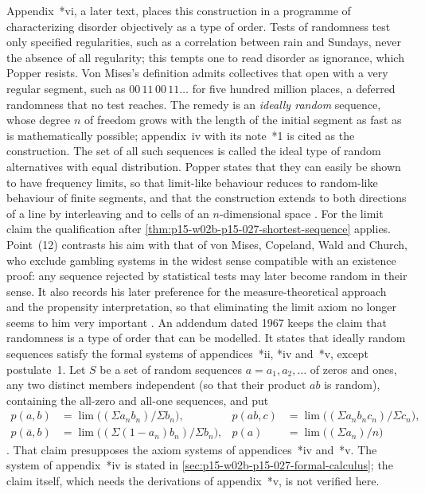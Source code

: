Appendix~*vi, a later text, places this construction in a programme of
characterizing disorder objectively as a type of order. Tests of
randomness test only specified regularities, such as a correlation
between rain and Sundays, never the absence of all regularity; this
tempts one to read disorder as ignorance, which Popper resists. Von
Mises's definition admits collectives that open with a very regular
segment, such as \(00\,11\,00\,11\ldots\) for five hundred million
places, a deferred randomness that no test reaches. The remedy is an
\emph{ideally random} sequence, whose degree \(n\) of freedom grows with
the length of the initial segment as fast as is mathematically
possible; appendix~iv with its note~*1 is cited as the construction. The
set of all such sequences is called the ideal type of random
alternatives with equal distribution. Popper states that they can easily
be shown to have frequency limits, so that limit-like behaviour reduces
to random-like behaviour of finite segments, and that the construction
extends to both directions of a line by interleaving and to cells of an
\(n\)-dimensional space \parencite[appendix~*vi, points~(1)--(11),
pp.~369--371]{Popper2002LogicDiscoveryUI}. For the limit claim the
qualification after \cref{thm:p15-w02b-p15-027-shortest-sequence} applies.
Point~(12) contrasts his aim with that of von Mises, Copeland, Wald and
Church, who exclude gambling systems in the widest sense compatible with
an existence proof: any sequence rejected by statistical tests may later
become random in their sense. It also records his later preference for
the measure-theoretical approach and the propensity interpretation, so
that eliminating the limit axiom no longer seems to him very important
\parencite[appendix~*vi, point~(12), pp.~371--372]{Popper2002LogicDiscoveryUI}.
An addendum dated 1967 keeps the claim that randomness is a type of order
that can be modelled. It states that ideally random sequences satisfy the
formal systems of appendices~*ii, *iv and~*v, except postulate~1. Let
\(S\) be a set of random sequences \(a=a_1,a_2,\ldots\) of zeros and ones,
any two distinct members independent (so that their product \(ab\) is
random), containing the all-zero and all-one sequences, and put
\[
\begin{aligned}
 p(a,b)&=\lim\bigl((\Sigma a_nb_n)/\Sigma b_n\bigr), &
 p(ab,c)&=\lim\bigl((\Sigma a_nb_nc_n)/\Sigma c_n\bigr),\\
 p(\bar a,b)&=\lim\bigl((\Sigma(1-a_n)b_n)/\Sigma b_n\bigr), &
 p(a)&=\lim\bigl((\Sigma a_n)/n\bigr)
\end{aligned}
\]
\parencite[appendix~*vi, points~(13)--(14), pp.~372--373]{Popper2002LogicDiscoveryUI}.
That claim presupposes the axiom systems of appendices~*iv and~*v. The
system of appendix~*iv is stated in \cref{sec:p15-w02b-p15-027-formal-calculus};
the claim itself, which needs the derivations of appendix~*v, is not
verified here.

